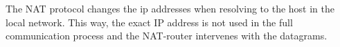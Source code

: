 The NAT protocol changes the ip addresses when resolving to the host in the local network.
This way, the exact IP address is not used in the full communication process and the NAT-router intervenes with the datagrams.